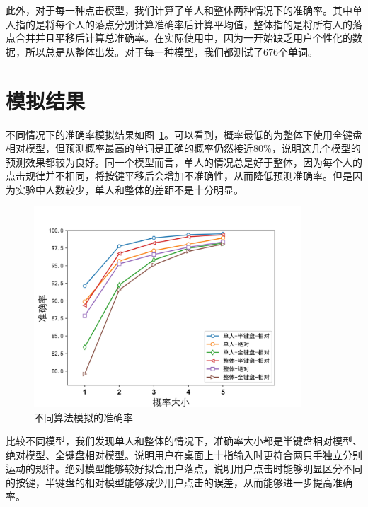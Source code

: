 此外，对于每一种点击模型，我们计算了单人和整体两种情况下的准确率。其中单人指的是将每个人的落点分别计算准确率后计算平均值，整体指的是将所有人的落点合并并且平移后计算总准确率。在实际使用中，因为一开始缺乏用户个性化的数据，所以总是从整体出发。对于每一种模型，我们都测试了676个单词。

\section{模拟结果}
不同情况下的准确率模拟结果如图~\ref{fig:simulation}。可以看到，概率最低的为整体下使用全键盘相对模型，但预测概率最高的单词是正确的概率仍然接近80\%，说明这几个模型的预测效果都较为良好。同一个模型而言，单人的情况总是好于整体，因为每个人的点击规律并不相同，将按键平移后会增加不准确性，从而降低预测准确率。但是因为实验中人数较少，单人和整体的差距不是十分明显。

\begin{figure}[h] %
    \centering
    \includegraphics[width=10cm]{figures/acc.jpg}
    \caption{不同算法模拟的准确率}
    \label{fig:simulation}
\end{figure}

比较不同模型，我们发现单人和整体的情况下，准确率大小都是半键盘相对模型、绝对模型、全键盘相对模型。说明用户在桌面上十指输入时更符合两只手独立分别运动的规律。绝对模型能够较好拟合用户落点，说明用户点击时能够明显区分不同的按键，半键盘的相对模型能够减少用户点击的误差，从而能够进一步提高准确率。